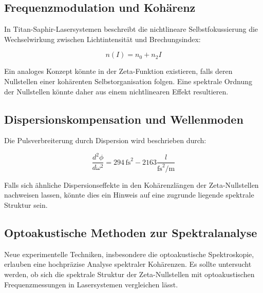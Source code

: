 \documentclass[a4paper,12pt]{article}
\begin{document}
\subsection{Frequenzmodulation und Kohärenz}
In Titan-Saphir-Lasersystemen beschreibt die nichtlineare Selbstfokussierung die Wechselwirkung zwischen Lichtintensität und Brechungsindex:

\begin{equation}
n(I) = n_0 + n_2 I
\end{equation}

Ein analoges Konzept könnte in der Zeta-Funktion existieren, falls deren Nullstellen einer kohärenten Selbstorganisation folgen. Eine spektrale Ordnung der Nullstellen könnte daher aus einem nichtlinearen Effekt resultieren.

\subsection{Dispersionskompensation und Wellenmoden}
Die Pulsverbreiterung durch Dispersion wird beschrieben durch:

\begin{equation}
\frac{d^2\phi}{d\omega^2} = 294\,\text{fs}^2 - 2163\frac{l}{\text{fs}^2/\text{m}}
\end{equation}

Falls sich ähnliche Dispersionseffekte in den Kohärenzlängen der Zeta-Nullstellen nachweisen lassen, könnte dies ein Hinweis auf eine zugrunde liegende spektrale Struktur sein.

\subsection{Optoakustische Methoden zur Spektralanalyse}
Neue experimentelle Techniken, insbesondere die optoakustische Spektroskopie, erlauben eine hochpräzise Analyse spektraler Kohärenzen. Es sollte untersucht werden, ob sich die spektrale Struktur der Zeta-Nullstellen mit optoakustischen Frequenzmessungen in Lasersystemen vergleichen lässt.
\end{document}
